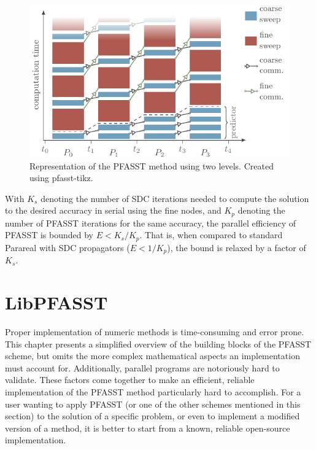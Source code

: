 \begin{figure}[ht]
  \centering
  \includegraphics[width=\textwidth]{images/pfasst_diagram.pdf}
  \caption{Representation of the PFASST method using two levels. Created using pfasst-tikz\footnotemark.}
\end{figure}

With \(K_s\) denoting the number of SDC iterations needed to compute the solution to the desired accuracy in serial using the fine nodes, and \(K_p\) denoting the number of PFASST iterations for the same accuracy, the parallel efficiency of PFASST is bounded by \(E < K_s/K_p\). That is, when compared to standard Parareal with SDC propagators (\(E < 1/K_p\)), the bound is relaxed by a factor of \(K_s\).

\section{LibPFASST} \label{sec:libpfasst_usage}

Proper implementation of numeric methods is time-consuming and error prone. This chapter presents a simplified overview of the building blocks of the PFASST scheme, but omits the more complex mathematical aspects an implementation must account for. Additionally, parallel programs are notoriously hard to validate. These factors come together to make an efficient, reliable implementation of the PFASST method particularly hard to accomplish. For a user wanting to apply PFASST (or one of the other schemes mentioned in this section) to the solution of a specific problem, or even to implement a modified version of a method, it is better to start from a known, reliable open-source implementation.

